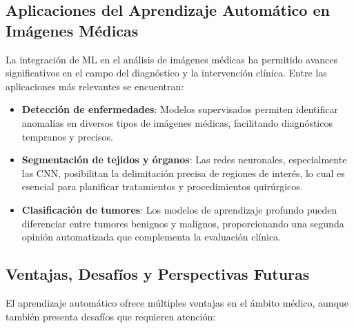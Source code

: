 \documentclass[11pt,spanish,listoffigures,listoftables]{tfgetsinf}
\begin{document}
\subsection{Aplicaciones del Aprendizaje Automático en Imágenes Médicas}

La integración de ML en el análisis de imágenes médicas ha permitido avances significativos en el campo del diagnóstico y la intervención clínica. Entre las aplicaciones más relevantes se encuentran:

\begin{itemize}
    \item \textbf{Detección de enfermedades}: Modelos supervisados permiten identificar anomalías en diversos tipos de imágenes médicas, facilitando diagnósticos tempranos y precisos.
    
    \item \textbf{Segmentación de tejidos y órganos}: Las redes neuronales, especialmente las CNN, posibilitan la delimitación precisa de regiones de interés, lo cual es esencial para planificar tratamientos y procedimientos quirúrgicos.
    
    \item \textbf{Clasificación de tumores}: Los modelos de aprendizaje profundo pueden diferenciar entre tumores benignos y malignos, proporcionando una segunda opinión automatizada que complementa la evaluación clínica.
\end{itemize}

\subsection{Ventajas, Desafíos y Perspectivas Futuras}

El aprendizaje automático ofrece múltiples ventajas en el ámbito médico, aunque también presenta desafíos que requieren atención:
\end{document}
